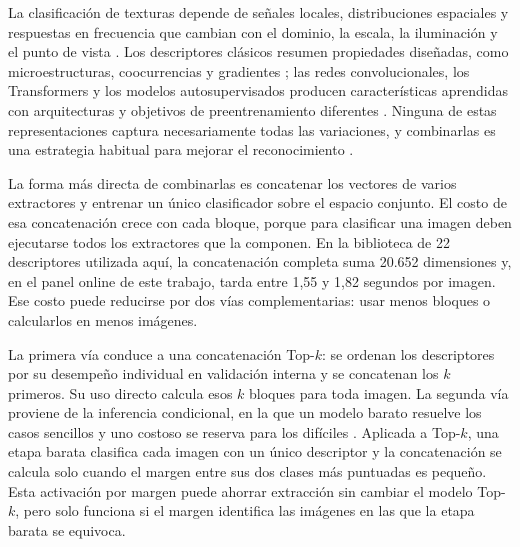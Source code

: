 \documentclass[a4paper,fleqn]{cas-sc}
\begin{document}
La clasificación de texturas depende de señales locales, distribuciones espaciales y respuestas en frecuencia que cambian con el dominio, la escala, la iluminación y el punto de vista \citep{cimpoi2014dtd,cimpoi2016fisher,liu2019survey}. Los descriptores clásicos resumen propiedades diseñadas, como microestructuras, coocurrencias y gradientes \citep{ojala2002lbp,haralick1979glcm,dalal2005hog}; las redes convolucionales, los Transformers y los modelos autosupervisados producen características aprendidas con arquitecturas y objetivos de preentrenamiento diferentes \citep{he2016resnet,tan2019efficientnet,dosovitskiy2021vit,liu2021swin,oquab2024dinov2}. Ninguna de estas representaciones captura necesariamente todas las variaciones, y combinarlas es una estrategia habitual para mejorar el reconocimiento \citep{sanchez2013image,cimpoi2016fisher,zhang2017deepten}.

La forma más directa de combinarlas es concatenar los vectores de varios extractores y entrenar un único clasificador sobre el espacio conjunto. El costo de esa concatenación crece con cada bloque, porque para clasificar una imagen deben ejecutarse todos los extractores que la componen. En la biblioteca de 22 descriptores utilizada aquí, la concatenación completa suma 20.652 dimensiones y, en el panel online de este trabajo, tarda entre 1,55 y 1,82 segundos por imagen. Ese costo puede reducirse por dos vías complementarias: usar menos bloques o calcularlos en menos imágenes.

La primera vía conduce a una concatenación Top-$k$: se ordenan los descriptores por su desempeño individual en validación interna y se concatenan los $k$ primeros. Su uso directo calcula esos $k$ bloques para toda imagen. La segunda vía proviene de la inferencia condicional, en la que un modelo barato resuelve los casos sencillos y uno costoso se reserva para los difíciles \citep{viola2001rapid,teerapittayanon2016branchynet,han2021dynamic}. Aplicada a Top-$k$, una etapa barata clasifica cada imagen con un único descriptor y la concatenación se calcula solo cuando el margen entre sus dos clases más puntuadas es pequeño. Esta activación por margen puede ahorrar extracción sin cambiar el modelo Top-$k$, pero solo funciona si el margen identifica las imágenes en las que la etapa barata se equivoca.
\end{document}
